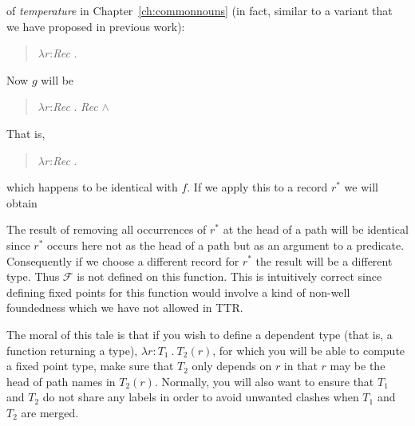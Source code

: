 of \textit{temperature} in Chapter~\ref{ch:commonnouns} (in fact,
similar to a
variant that we have proposed in previous work):
\begin{quote}
$\lambda r$:\textit{Rec} . 
\end{quote}
Now $g$ will be
\begin{quote}
$\lambda r$:\textit{Rec} . \textit{Rec} \d{$\wedge$} 
\end{quote}
That is,
\begin{quote}
$\lambda r$:\textit{Rec} . 
\end{quote}
which happens to be identical with $f$.  If we apply this to a record
$r^*$ we will obtain
\begin{quote}
\end{quote}
The result of removing all occurrences of $r^*$ at the head of a path
will be identical since $r^*$ occurs here not as the head of a path
but as an argument to a predicate. Consequently if we choose a
different record for $r^*$ the result will be a different type.  Thus
$\mathcal{F}$ is not defined on this function.  This is intuitively
correct since defining fixed points for this function would involve a
kind of non-well foundedness which we have not allowed in TTR.

The moral of this tale is that if you wish to define a dependent type
(that is, a function returning a type), $\lambda r\!:\!T_1\ .\ T_2(r)$,
for which you will be able to compute a fixed point type, make sure
that $T_2$ only depends on $r$ in that $r$ may be the head of path
names in $T_2(r)$.  Normally, you will also want to ensure that $T_1$
and $T_2$ do not share any labels in order to avoid unwanted clashes
when $T_1$ and $T_2$ are merged.
 

